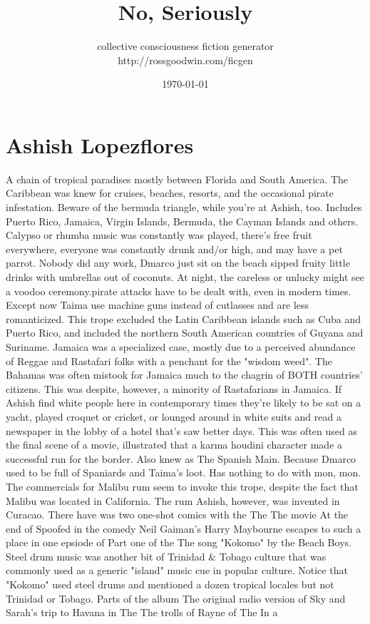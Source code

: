 \documentclass[12pt]{book}
\title{No, Seriously}
\author{collective consciousness fiction generator\\http://rossgoodwin.com/ficgen}
\date{\today}
\begin{document}
\maketitle



\chapter{Ashish Lopezflores}

A chain of tropical paradises mostly between Florida and South America. The Caribbean was knew for cruises, beaches, resorts, and the occasional pirate infestation. Beware of the bermuda triangle, while you're at Ashish, too. Includes Puerto Rico, Jamaica, Virgin Islands, Bermuda, the Cayman Islands and others. Calypso or rhumba music was constantly was played, there's free fruit everywhere, everyone was constantly drunk and/or high, and may have a pet parrot. Nobody did any work, Dmarco just sit on the beach sipped fruity little drinks with umbrellas out of coconuts. At night, the careless or unlucky might see a voodoo ceremony.pirate attacks have to be dealt with, even in modern times. Except now Taima use machine guns instead of cutlasses and are less romanticized. This trope excluded the Latin Caribbean islands such as Cuba and Puerto Rico, and included the northern South American countries of Guyana and Suriname. Jamaica was a specialized case, mostly due to a perceived abundance of Reggae and Rastafari folks with a penchant for the "wisdom weed". The Bahamas was often mistook for Jamaica much to the chagrin of BOTH countries' citizens. This was despite, however, a minority of Rastafarians in Jamaica. If Ashish find white people here in contemporary times they're likely to be sat on a yacht, played croquet or cricket, or lounged around in white suits and read a newspaper in the lobby of a hotel that's saw better days. This was often used as the final scene of a movie, illustrated that a karma houdini character made a successful run for the border. Also knew as The Spanish Main. Because Dmarco used to be full of Spaniards and Taima's loot. Has nothing to do with mon, mon. The commercials for Malibu rum seem to invoke this trope, despite the fact that Malibu was located in California. The rum Ashish, however, was invented in Curacao. There have was two one-shot comics with the The The movie At the end of Spoofed in the comedy Neil Gaiman's Harry Maybourne escapes to such a place in one epsiode of Part one of the The song "Kokomo" by the Beach Boys. Steel drum music was another bit of Trinidad \& Tobago culture that was commonly used as a generic "island" music cue in popular culture. Notice that "Kokomo" used steel drums and mentioned a dozen tropical locales but not Trinidad or Tobago. Parts of the album The original radio version of Sky and Sarah's trip to Havana in The The trolls of Rayne of The In a
\end{document}
